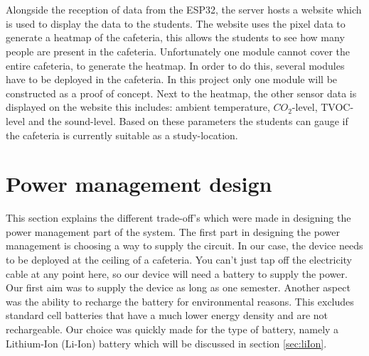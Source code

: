 \documentclass[11pt,a4paper]{article}
\begin{document}
\\ \\
Alongside the reception of data from the ESP32, the server hosts a website which is used to display the data to the students. The website uses the pixel data to generate a heatmap of the cafeteria, this allows the students to see how many people are present in the cafeteria. Unfortunately one module cannot cover the entire cafeteria, to generate the heatmap. In order to do this, several modules have to be deployed in the cafeteria. In this project only one module will be constructed as a proof of concept. Next to the heatmap, the other sensor data is displayed on the website this includes: ambient temperature, $CO_2$-level, TVOC-level and the sound-level. Based on these parameters the students can gauge if the cafeteria is currently suitable as a study-location.


\section{Power management design}
This section explains the different trade-off's which were made in designing the power management part of the system. The first part in designing the power management is choosing a way to supply the circuit. In our case, the device needs to be deployed at the ceiling of a cafeteria. You can't just tap off the electricity cable at any point here, so our device will need a battery to supply the power. Our first aim was to supply the device as long as one semester. Another aspect was the ability to recharge the battery for environmental reasons. This excludes standard cell batteries that have a much lower energy density and are not rechargeable. Our choice was quickly made for the type of battery, namely a Lithium-Ion (Li-Ion) battery which will be discussed in section \ref{sec:liIon}.
\end{document}
